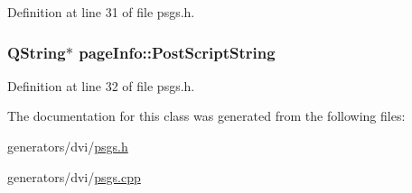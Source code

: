 Definition at line 31 of file psgs.\+h.

\hypertarget{classpageInfo_a7147ce91acc430c40a335c9e4c5f93d7}{
\subsubsection[{Post\+Script\+String}]{\setlength{\rightskip}{0pt plus 5cm}Q\+String$\ast$ page\+Info\+::\+Post\+Script\+String}}\label{classpageInfo_a7147ce91acc430c40a335c9e4c5f93d7}


Definition at line 32 of file psgs.\+h.



The documentation for this class was generated from the following files\+:\begin{DoxyCompactItemize}
\item 
generators/dvi/\hyperlink{psgs_8h}{psgs.\+h}\item 
generators/dvi/\hyperlink{psgs_8cpp}{psgs.\+cpp}\end{DoxyCompactItemize}
